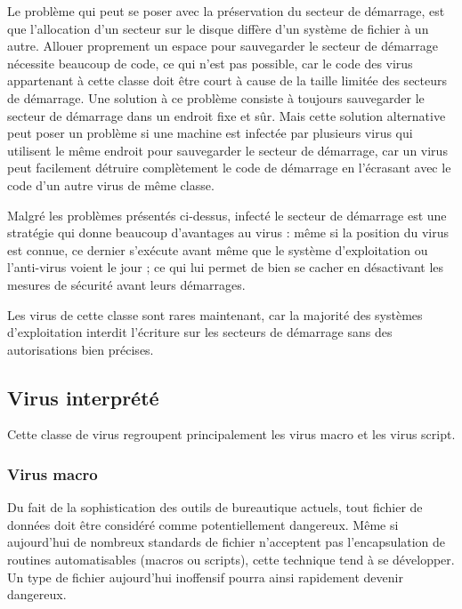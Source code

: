     Le problème qui peut se poser avec la préservation du secteur de démarrage, est que l'allocation d'un secteur 
    sur le disque diffère d'un système de fichier à un autre. Allouer proprement un espace pour sauvegarder 
    le secteur de démarrage nécessite beaucoup de code, ce qui n'est pas possible, car le code des virus
    appartenant à cette classe doit être court à cause de la taille limitée des secteurs de démarrage.
    Une solution à ce problème consiste à toujours sauvegarder le secteur de démarrage dans un endroit fixe et sûr.
    Mais cette solution alternative peut poser un problème si une machine est infectée par plusieurs virus qui utilisent
    le même endroit pour sauvegarder le secteur de démarrage, car un virus peut facilement détruire complètement 
    le code de démarrage en l'écrasant avec le code d'un autre virus de même classe. \cite{virus} %

    Malgré les problèmes présentés ci-dessus, infecté le secteur de démarrage est une stratégie qui donne beaucoup
    d'avantages au virus : même si la position du virus est connue, ce dernier s'exécute avant même que le système 
    d'exploitation ou l'anti-virus voient le jour ; ce qui lui permet de bien se cacher en désactivant les mesures 
    de sécurité avant leurs démarrages. %

    Les virus de cette classe sont rares maintenant, car la majorité des systèmes d'exploitation interdit l'écriture
    sur les secteurs de démarrage sans des autorisations bien précises.

    \subsection{Virus interprété}
    Cette classe de virus regroupent principalement les virus macro et les virus script. %
        \subsubsection{Virus macro}
        Du fait de la sophistication des outils de bureautique actuels, tout fichier de données doit être 
        considéré comme potentiellement dangereux. Même si aujourd’hui de nombreux standards de fichier 
        n’acceptent pas l’encapsulation de routines automatisables (macros ou scripts), 
        cette technique tend à se développer. Un type de fichier aujourd’hui inoffensif pourra ainsi 
        rapidement devenir dangereux. \cite{virus_informatique_article} %

